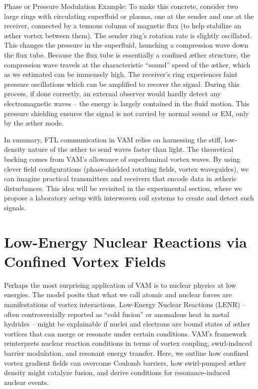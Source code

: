 Phase or Pressure Modulation Example: To make this concrete, consider two large rings with circulating superfluid or plasma, one at the sender and one at the receiver, connected by a tenuous column of magnetic flux (to help stabilize an æther vortex between them). The sender ring’s rotation rate is slightly oscillated. This changes the pressure in the superfluid, launching a compression wave down the flux tube. Because the flux tube is essentially a confined æther structure, the compression wave travels at the characteristic “sound” speed of the æther, which as we estimated can be immensely high. The receiver’s ring experiences faint pressure oscillations which can be amplified to recover the signal. During this process, if done correctly, an external observer would hardly detect any electromagnetic waves – the energy is largely contained in the fluid motion. This pressure shielding ensures the signal is not carried by normal sound or EM, only by the æther mode.


In summary, FTL communication in VAM relies on harnessing the stiff, low-density nature of the æther to send waves faster than light. The theoretical backing comes from VAM’s allowance of superluminal vortex waves. By using clever field configurations (phase-shielded rotating fields, vortex waveguides), we can imagine practical transmitters and receivers that encode data in ætheric disturbances. This idea will be revisited in the experimental section, where we propose a laboratory setup with interwoven coil systems to create and detect such signals.


\section*{Low-Energy Nuclear Reactions via Confined Vortex Fields}

Perhaps the most surprising application of VAM is to nuclear physics at low energies. The model posits that what we call atomic and nuclear forces are manifestations of vortex interactions. Low-Energy Nuclear Reactions (LENR) – often controversially reported as “cold fusion” or anomalous heat in metal hydrides – might be explainable if nuclei and electrons are bound states of æther vortices that can merge or resonate under certain conditions. VAM’s framework reinterprets nuclear reaction conditions in terms of vortex coupling, swirl-induced barrier modulation, and resonant energy transfer. Here, we outline how confined vortex gradient fields can overcome Coulomb barriers, how swirl-pumped æther density might catalyze fusion, and derive conditions for resonance-induced nuclear events.


